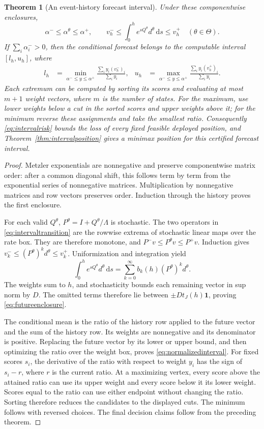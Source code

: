 \documentclass[11pt]{article}
\theoremstyle{plain}
\newtheorem{theorem}{Theorem}[section]
\theoremstyle{definition}
\theoremstyle{remark}
\newcommand{\dd}{\,\mathrm d}
\begin{document}
\begin{theorem}[An event-history forecast interval]
\label{thm:eventinterval}
Under these componentwise enclosures,
\[
 \alpha^-\le\alpha^\theta\le\alpha^+,\qquad
 v_h^-\le\int_0^h e^{sQ^\theta}d^\theta\dd s\le v_h^+
 \quad(\theta\in\Theta).
\]
If \(\sum_i\alpha_i^->0\), then the conditional forecast belongs to
the computable interval \([l_h,u_h]\), where
\begin{align}
 l_h&=\min_{\alpha^-\le y\le\alpha^+}
                 \frac{\sum_i y_i(v_h^-)_i}{\sum_i y_i},
 &
 u_h&=\max_{\alpha^-\le y\le\alpha^+}
                 \frac{\sum_i y_i(v_h^+)_i}{\sum_i y_i}.
 \label{eq:normalizedinterval}
\end{align}
Each extremum can be computed by sorting its scores and
evaluating at most \(m+1\) weight vectors, where \(m\) is the
number of states. For the maximum, use lower weights below a
cut in the sorted scores and upper weights above it; for the
minimum reverse these assignments and take the smallest ratio.
Consequently \eqref{eq:intervalrisk} bounds the loss of every
fixed feasible deployed position, and
Theorem~\ref{thm:intervalposition} gives a minimax position for
this certified forecast interval.
\end{theorem}
\begin{proof}
Metzler exponentials are nonnegative and preserve componentwise
matrix order: after a common diagonal shift, this follows term
by term from the exponential series of nonnegative matrices.
Multiplication by nonnegative matrices and row vectors preserves
order. Induction through the history proves the first enclosure.

For each valid \(Q^\theta\),
\(P^\theta=I+Q^\theta/\Lambda\) is stochastic.
The two operators in \eqref{eq:intervaltransition} are the
rowwise extrema of stochastic linear maps over the rate box.
They are therefore monotone, and
\(P^-v\le P^\theta v\le P^+v\). Induction gives
\(v_k^-\le(P^\theta)^kd^\theta\le v_k^+\).
Uniformization and integration yield
\[
 \int_0^h e^{sQ^\theta}d^\theta\dd s
 =\sum_{k=0}^{\infty}b_k(h)(P^\theta)^kd^\theta .
\]
The weights sum to \(h\), and stochasticity bounds each remaining
vector in sup norm by \(D\). The omitted terms therefore lie
between \(\pm Dt_J(h)\mathbf1\), proving
\eqref{eq:futureenclosure}.

The conditional mean is the ratio of the history row applied
to the future vector and the sum of the history row. Its weights
are nonnegative and its denominator is positive. Replacing the
future vector by its lower or upper bound, and then optimizing
the ratio over the weight box, proves
\eqref{eq:normalizedinterval}.
For fixed scores \(s_i\), the derivative of the ratio with
respect to weight \(y_i\) has the sign of \(s_i-r\), where
\(r\) is the current ratio. At a maximizing vertex, every score
above the attained ratio can use its upper weight and every
score below it its lower weight. Scores equal to the ratio
can use either endpoint without changing the ratio. Sorting
therefore reduces the candidates to the displayed cuts.
The minimum follows with reversed choices.
The final decision claims follow from the preceding theorem.
\end{proof}
\end{document}
